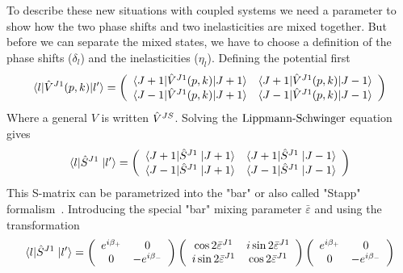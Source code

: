 To describe these new situations with coupled systems we need a parameter to 
show how the two phase shifts and two inelasticities are mixed together. But before we can separate the mixed states,
we have to choose a definition of the phase shifts
($\delta_l$) and the inelasticities ($\eta_l$). 
Defining the potential first 
%
\begin{equation} 
\langle{ l}|\hat{V}^{J1}(p,k)|{ l'}\rangle= 
\left(
\begin{array}{cc} {{ \ensuremath{\langle J+1|} \ensuremath{\hat{V}}^{J1}(p,k)\ensuremath{|J+1\rangle} }}
& 
{\langle J+1| \hat{V}^{J1}(p,k)|J-1\rangle } \\
{\langle J-1| \hat{V}^{J1}(p,k)|J+1\rangle }
&
{\langle J-1| \hat{V}^{J1}(p,k)|J-1\rangle }
\end{array} \right)
\end{equation}
%
Where a general $V$ is written  $\hat{V}^{JS}$.
Solving the $\text{Lippmann-Schwinger}$ equation gives
%
\begin{equation}
\langle{ l}|\hat{S}^{J1}\;|{ l'}\rangle=
\left(
\begin{array}{cc} {{ \ensuremath{\langle J+1|} \ensuremath{\hat{S}}^{J1}\;\ensuremath{|J+1\rangle} }}
&
{\langle J+1| \hat{S}^{J1}\;|J-1\rangle } \\
{\langle J-1| \hat{S}^{J1}\;|J+1\rangle }
&
{\langle J-1| \hat{S}^{J1}\;|J-1\rangle }
\end{array} \right)
\end{equation}
%
This S-matrix can be parametrized into the "bar" or also called "Stapp" formalism~\cite{Stapp-bar}. Introducing the special
"bar" mixing parameter $\bar{\varepsilon}$ and using the transformation
%
\begin{equation}
\langle{ l}|\hat{S}^{J1}\;|{ l'}\rangle 
=
\left(
\begin{array}{cc}
{e^{i\beta_+}}    & {0}\\
       0          & -e^{i\beta_-}
\end{array} \right)
\left(
\begin{array}{cc}
{\cos 2\bar{\varepsilon}^{J1}}   &  {i\sin 2\bar{\varepsilon}^{J1}}\\
{i\sin 2\bar{\varepsilon}^{J1}}  &  {\cos 2\bar{\varepsilon}^{J1}}
\end{array} \right)
\left(
\begin{array}{cc}
{e^{i\beta_+}}    & {0}\\
       0          & -e^{i\beta_-}
\end{array} \right)
\end{equation}
